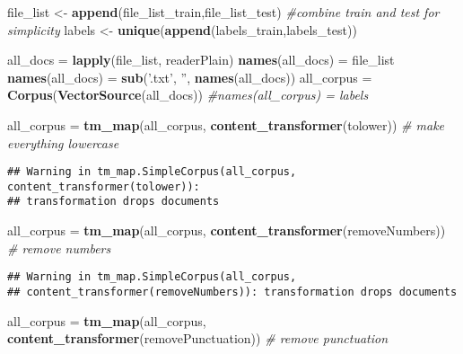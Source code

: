 \documentclass[]{article}
\newenvironment{Shaded}{\begin{snugshade}}{\end{snugshade}}
\newcommand{\KeywordTok}[1]{\textcolor[rgb]{0.13,0.29,0.53}{\textbf{#1}}}
\newcommand{\StringTok}[1]{\textcolor[rgb]{0.31,0.60,0.02}{#1}}
\newcommand{\CommentTok}[1]{\textcolor[rgb]{0.56,0.35,0.01}{\textit{#1}}}
\newcommand{\NormalTok}[1]{#1}
\begin{document}
\begin{Shaded}
\begin{Highlighting}[]
\NormalTok{file_list <-}\StringTok{ }\KeywordTok{append}\NormalTok{(file_list_train,file_list_test) }\CommentTok{#combine train and test for simplicity}
\NormalTok{labels <-}\StringTok{ }\KeywordTok{unique}\NormalTok{(}\KeywordTok{append}\NormalTok{(labels_train,labels_test))}

\NormalTok{all_docs =}\StringTok{ }\KeywordTok{lapply}\NormalTok{(file_list, readerPlain) }
\KeywordTok{names}\NormalTok{(all_docs) =}\StringTok{ }\NormalTok{file_list}
\KeywordTok{names}\NormalTok{(all_docs) =}\StringTok{ }\KeywordTok{sub}\NormalTok{(}\StringTok{'.txt'}\NormalTok{, }\StringTok{''}\NormalTok{, }\KeywordTok{names}\NormalTok{(all_docs))}
\NormalTok{all_corpus =}\StringTok{ }\KeywordTok{Corpus}\NormalTok{(}\KeywordTok{VectorSource}\NormalTok{(all_docs))}
\CommentTok{#names(all_corpus) = labels}

\NormalTok{all_corpus =}\StringTok{ }\KeywordTok{tm_map}\NormalTok{(all_corpus, }\KeywordTok{content_transformer}\NormalTok{(tolower)) }\CommentTok{# make everything lowercase}
\end{Highlighting}
\end{Shaded}

\begin{verbatim}
## Warning in tm_map.SimpleCorpus(all_corpus, content_transformer(tolower)):
## transformation drops documents
\end{verbatim}

\begin{Shaded}
\begin{Highlighting}[]
\NormalTok{all_corpus =}\StringTok{ }\KeywordTok{tm_map}\NormalTok{(all_corpus, }\KeywordTok{content_transformer}\NormalTok{(removeNumbers)) }\CommentTok{# remove numbers}
\end{Highlighting}
\end{Shaded}

\begin{verbatim}
## Warning in tm_map.SimpleCorpus(all_corpus,
## content_transformer(removeNumbers)): transformation drops documents
\end{verbatim}

\begin{Shaded}
\begin{Highlighting}[]
\NormalTok{all_corpus =}\StringTok{ }\KeywordTok{tm_map}\NormalTok{(all_corpus, }\KeywordTok{content_transformer}\NormalTok{(removePunctuation)) }\CommentTok{# remove punctuation}
\end{Highlighting}
\end{Shaded}
\end{document}
